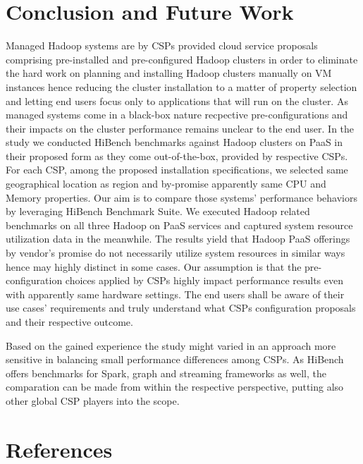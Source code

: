 \documentclass[review]{elsarticle}
\begin{document}
\section{Conclusion and Future Work}
Managed Hadoop systems are by CSPs provided cloud service proposals comprising pre-installed and pre-configured Hadoop clusters in order to eliminate the hard work on planning and installing Hadoop clusters manually on VM instances hence reducing the cluster installation to a matter of property selection and letting end users focus only to applications that will run on the cluster. As managed systems come in a black-box nature recpective pre-configurations and their impacts on the cluster performance remains unclear to the end user. In the study we  conducted HiBench benchmarks against Hadoop clusters on PaaS in their proposed form as they come out-of-the-box, provided by respective CSPs. For each CSP, among the proposed installation specifications, we selected same geographical location as region and by-promise apparently same CPU and Memory properties. Our aim is to compare those systems' performance behaviors by leveraging HiBench Benchmark Suite. We executed Hadoop related benchmarks on all three Hadoop on PaaS services and captured system resource utilization data in the meanwhile. The results yield that Hadoop PaaS offerings by vendor's promise do not necessarily utilize system resources in similar ways hence may highly distinct in some cases. Our assumption is that the pre-configuration choices applied by CSPs highly impact performance results even with apparently same hardware settings. The end users shall be aware of their use cases' requirements and truly understand what CSPs configuration proposals and their respective outcome.

Based on the gained experience the study might varied in an approach more sensitive in balancing small performance differences among CSPs. As HiBench offers benchmarks for Spark, graph and streaming frameworks as well, the comparation can be made from within the respective perspective, putting also other global CSP players into the scope. 

\section*{References}

\end{document}
